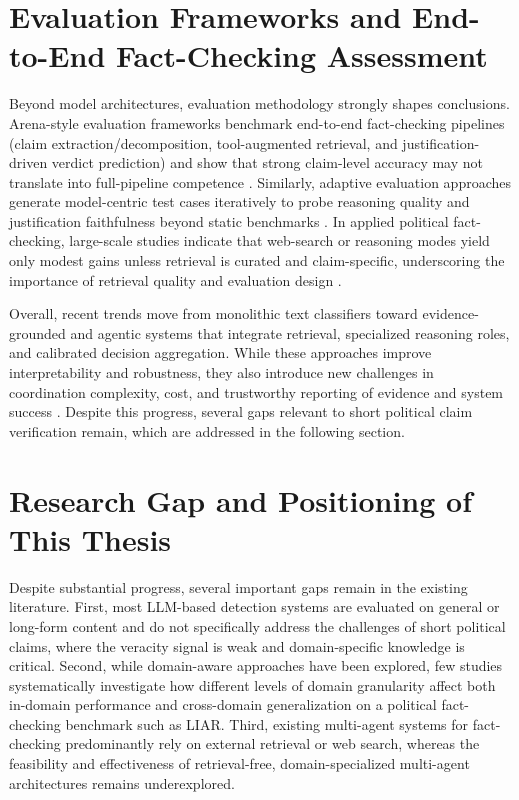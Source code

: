 \section{Evaluation Frameworks and End-to-End Fact-Checking Assessment} 

Beyond model architectures, evaluation methodology strongly shapes conclusions. Arena-style evaluation frameworks benchmark end-to-end fact-checking pipelines (claim extraction/decomposition, tool-augmented retrieval, and justification-driven verdict prediction) and show that strong claim-level accuracy may not translate into full-pipeline competence \cite{lin2026comprehensivestagewisebenchmarkinglarge}. Similarly, adaptive evaluation approaches generate model-centric test cases iteratively to probe reasoning quality and justification faithfulness beyond static benchmarks \cite{lin-etal-2025-fact}. In applied political fact-checking, large-scale studies indicate that web-search or reasoning modes yield only modest gains unless retrieval is curated and claim-specific, underscoring the importance of retrieval quality and evaluation design \cite{deverna2025largelanguagemodelsrequire}. 

Overall, recent trends move from monolithic text classifiers toward evidence-grounded and agentic systems that integrate retrieval, 
specialized reasoning roles, and calibrated decision aggregation. While these approaches improve interpretability and robustness, they also introduce new challenges in coordination complexity, cost, and trustworthy reporting of evidence and system success 
\cite{DBIS2025,chen2025evidenceboundautonomousresearchevibound}. Despite this progress, several gaps relevant to short political claim verification remain, which are addressed in the following section.

\section{Research Gap and Positioning of This Thesis}

Despite substantial progress, several important gaps remain in the existing literature. First, most LLM-based detection systems are 
evaluated on general or long-form content and do not specifically address the challenges of short political claims, where the veracity signal is weak and domain-specific knowledge is critical. Second, while domain-aware approaches have been explored, few studies systematically investigate how different levels of domain granularity affect both in-domain performance and cross-domain generalization on a political fact-checking benchmark such as LIAR. Third, existing multi-agent systems for fact-checking predominantly rely on external retrieval or web search, whereas the feasibility and effectiveness of retrieval-free, domain-specialized multi-agent architectures remains underexplored.

